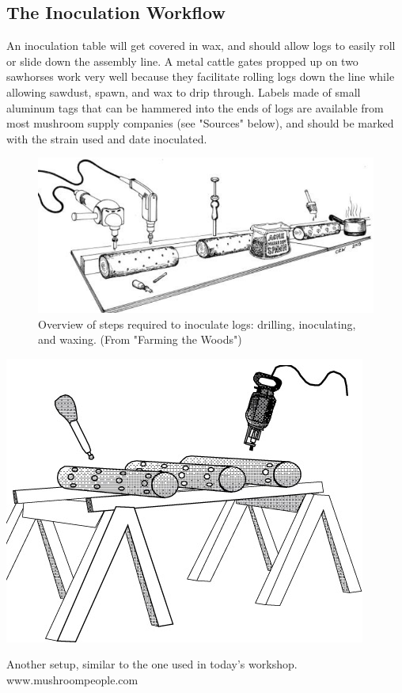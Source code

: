 \documentclass{tufte-handout}
\begin{document}
\subsection{The Inoculation Workflow}

An inoculation table will get covered in wax, and should allow logs to easily roll or slide down the assembly line. 
A metal cattle gates propped up on two
sawhorses work very well because they
facilitate rolling logs down the line while
allowing sawdust, spawn, and wax to drip
through. 
Labels made of small aluminum tags that can be hammered into the ends of logs are available from most mushroom supply companies (see "Sources" below), and should be marked with the strain used and date inoculated.


\begin{figure}
\includegraphics{innoculation-workflow}
\caption{Overview of steps required to inoculate logs: drilling, inoculating, and waxing. (From "Farming the Woods")}
\end{figure}

\begin{marginfigure}
\includegraphics{drill-logs}
\caption{Another setup, similar to the one  used in today's workshop. www.mushroompeople.com}
\end{marginfigure}
\end{document}
